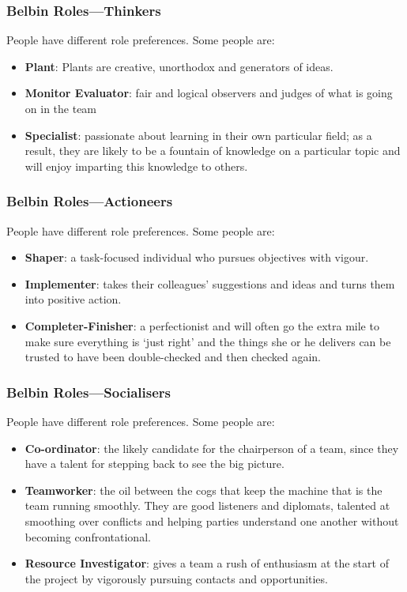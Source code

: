 \begin{frame}
	\frametitle{Belbin Roles---Thinkers}
	
	People have different role preferences. Some people are:
	
	\begin{itemize}
		\item \textbf{Plant}: Plants are creative, unorthodox and generators of ideas.
		\item \textbf{Monitor Evaluator}: fair and logical observers and judges of what is going on in the team
		\item \textbf{Specialist}: passionate about learning in their own particular field; as a result, they are likely to be a fountain of knowledge on a particular topic and will enjoy imparting this knowledge to others.
	\end{itemize}
	
\end{frame}

\begin{frame}
	\frametitle{Belbin Roles---Actioneers}
	
	People have different role preferences. Some people are:
	
	\begin{itemize}
		\item \textbf{Shaper}: a task-focused individual who pursues objectives with vigour.
		\item \textbf{Implementer}: takes their colleagues' suggestions and ideas and turns them into positive action.
		\item \textbf{Completer-Finisher}: a perfectionist and will often go the extra mile to make sure everything is `just right' and the things she or he delivers can be trusted to have been double-checked and then checked again.
	\end{itemize}
	
\end{frame}

\begin{frame}
	\frametitle{Belbin Roles---Socialisers}
	
	People have different role preferences. Some people are:
	
	\begin{itemize}
		\item \textbf{Co-ordinator}: the likely candidate for the chairperson of a team, since they have a talent for stepping back to see the big picture.
		\item \textbf{Teamworker}: the oil between the cogs that keep the machine that is the team running smoothly. They are good listeners and diplomats, talented at smoothing over conflicts and helping parties understand one another without becoming confrontational.
		\item \textbf{Resource Investigator}: gives a team a rush of enthusiasm at the start of the project by vigorously pursuing contacts and opportunities.
	\end{itemize}
	
\end{frame}

